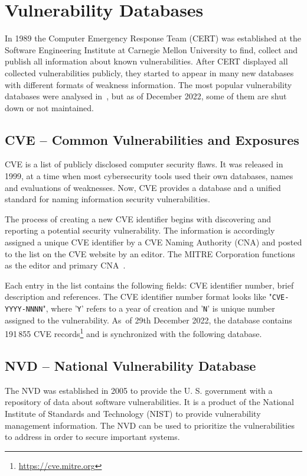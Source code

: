 
  \section{Vulnerability Databases}
  In 1989 the Computer Emergency Response Team (CERT) was established at the Software Engineering Institute
  at Carnegie Mellon University to find, collect and publish all information about known vulnerabilities.
  After CERT displayed all collected vulnerabilities publicly, they started to appear in many new databases
  with different formats of weakness information. The most popular vulnerability databases were analysed
  in~\cite{VulnDBs}, but as of December 2022, some of them are shut down or not maintained.

  \subsection*{CVE -- Common Vulnerabilities and Exposures}
    CVE is a list of publicly disclosed computer security flaws. It was released in 1999, at a time when
    most cybersecurity tools used their own databases, names and evaluations of weaknesses. Now, CVE provides
    a database and a unified standard for naming information security vulnerabilities.

    The process of creating a new CVE identifier begins with discovering and reporting a potential security
    vulnerability. The information is accordingly assigned a unique CVE identifier by a CVE Naming Authority
    (CNA) and posted to the list on the CVE website by an editor. The MITRE Corporation functions as the editor
    and primary CNA~\cite{CVE}.

    Each entry in the list contains the following fields: CVE identifier number, brief description and references.
    The CVE identifier number format looks like "\texttt{CVE-YYYY-NNNN}", where
    '\texttt{Y}' refers to a year of creation and '\texttt{N}' is unique number assigned to the vulnerability.
    As~of 29th December 2022, the database contains 191\,855 CVE records\footnote{\href{https://cve.mitre.org}
    {https://cve.mitre.org}} and is synchronized with the following database.

  \subsection*{NVD -- National Vulnerability Database}
  The NVD was established in 2005 to provide the U. S. government with a repository of data about software
  vulnerabilities. It is a product of the National Institute of Standards and Technology (NIST) to provide
  vulnerability management information. The NVD can be used to prioritize the vulnerabilities to address
  in order to secure important systems.

